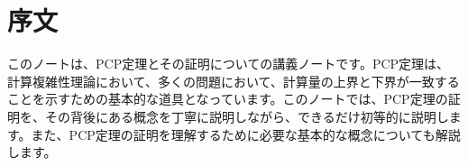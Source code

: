 \chapter*{序文}

このノートは、PCP定理とその証明についての講義ノートです。PCP定理は、計算複雑性理論において、多くの問題において、計算量の上界と下界が一致することを示すための基本的な道具となっています。このノートでは、PCP定理の証明を、その背後にある概念を丁寧に説明しながら、できるだけ初等的に説明します。また、PCP定理の証明を理解するために必要な基本的な概念についても解説します。